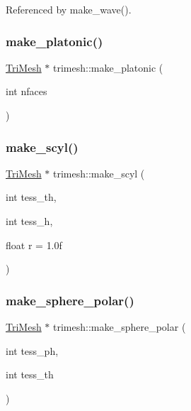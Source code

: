 Referenced by make\+\_\+wave().

\mbox{\label{namespacetrimesh_ade7ab00357a31b6c07aa601ef79f2f1d}} 
\subsubsection{\texorpdfstring{make\+\_\+platonic()}{make\_platonic()}}
{\footnotesize\ttfamily \hyperlink{classtrimesh_1_1TriMesh}{Tri\+Mesh} $\ast$ trimesh\+::make\+\_\+platonic (\begin{DoxyParamCaption}\item[{int}]{nfaces }\end{DoxyParamCaption})}

\mbox{\label{namespacetrimesh_af6e8ce0e3a16b4ea8f1ac43657b9ebaf}} 
\subsubsection{\texorpdfstring{make\+\_\+scyl()}{make\_scyl()}}
{\footnotesize\ttfamily \hyperlink{classtrimesh_1_1TriMesh}{Tri\+Mesh} $\ast$ trimesh\+::make\+\_\+scyl (\begin{DoxyParamCaption}\item[{int}]{tess\+\_\+th,  }\item[{int}]{tess\+\_\+h,  }\item[{float}]{r = {\ttfamily 1.0f} }\end{DoxyParamCaption})}

\mbox{\label{namespacetrimesh_aa574c5777b2d5ee3b0cde3a8c1d9e132}} 
\subsubsection{\texorpdfstring{make\+\_\+sphere\+\_\+polar()}{make\_sphere\_polar()}}
{\footnotesize\ttfamily \hyperlink{classtrimesh_1_1TriMesh}{Tri\+Mesh} $\ast$ trimesh\+::make\+\_\+sphere\+\_\+polar (\begin{DoxyParamCaption}\item[{int}]{tess\+\_\+ph,  }\item[{int}]{tess\+\_\+th }\end{DoxyParamCaption})}

